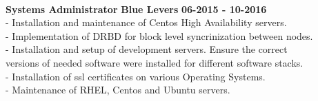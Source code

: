 \documentclass[12pt,a4paper]{article}
\begin{document}
\raggedright{}\\
\textbf{Systems Administrator}
\hspace*{1.8cm}\textbf{Blue Levers}
\hspace*{1.8cm}\textbf{06-2015 - 10-2016}\\
\hspace*{.5cm} - Installation and maintenance of Centos High Availability servers.\\
\hspace*{.5cm} - Implementation of DRBD for block level syncrinization between nodes.\\
\hspace*{.5cm} - Installation and setup of development servers. Ensure the correct \\
\hspace*{.7cm} versions of needed software were installed for different software stacks.\\ 
\hspace*{.5cm} - Installation of ssl certificates on various Operating Systems.\\
\hspace*{.5cm} - Maintenance of RHEL, Centos and Ubuntu servers.\\
\\
\end{document}
